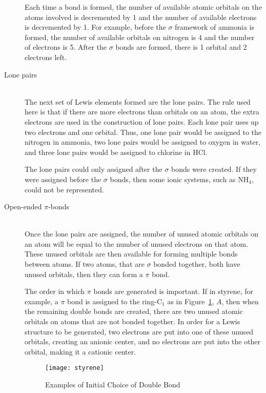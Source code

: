 \begin{description}
Each time a bond is formed, the number of available atomic orbitals on the
atoms involved is decremented by 1 and the number of available electrons is
decremented by 1.  For example, before the $\sigma$ framework  of ammonia is
formed, the number of available orbitals on nitrogen is 4 and the number of
electrons is 5. After the $\sigma$ bonds are formed, there is 1 orbital and 2
electrons left.

\item[Lone pairs]~\\
The next set of Lewis elements formed are the lone pairs.  The rule used here
is that if there are more electrons than orbitals on an atom, the extra
electrons are used in the construction of lone pairs.  Each lone pair uses up
two electrons and one orbital.  Thus, one lone pair would be assigned to the
nitrogen in ammonia, two lone pairs would be assigned to oxygen in water, and
three lone pairs would be assigned to chlorine in HCl.

The lone pairs could only assigned after the $\sigma$ bonds were created.  If
they were assigned before the $\sigma$ bonds, then some ionic systems, such as
NH$_4$, could not be represented.

\item[Open-ended $\pi$-bonds]~\\
Once the lone pairs are assigned, the number of unused atomic orbitals on an
atom will be equal to the number of unused electrons on that atom.  These
unused orbitals are then available for forming multiple bonds between atoms. 
If two atoms, that are $\sigma$ bonded together, both have unused orbitals,
then they can form a $\pi$ bond.  

The order in which $\pi$ bonds are generated is important.  If in styrene,  for
example, a $\pi$ bond is assigned to the ring-C$_1$ as in Figure~\ref{styrene},
$A$, then when the remaining double bonds are created, there are two unused
atomic orbitals on atoms that are not bonded together.  In order for a Lewis
structure to be generated, two electrons are put into one of these unused
orbitals,  creating an anionic center, and no electrons are put into the other
orbital, making it a cationic center.

\begin{figure}
\begin{makeimage}
\end{makeimage}
\begin{center}  
\texttt{[image: styrene]}
\end{center}  
\caption{\label{styrene} Examples of Initial Choice of Double Bond}  
\end{figure} 



\end{description}
